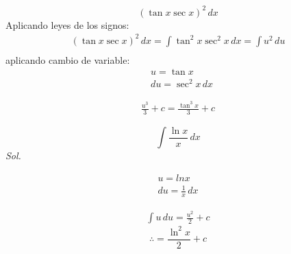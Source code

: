 \begin{problem}
    \begin{equation}
        \left(\tan{x}\sec{x}\right)^2\,dx
    \end{equation}
Aplicando leyes de los signos:
\begin{align*}
    \left(\tan{x}\sec{x}\right)^2\,dx = \int \tan^2{x}\sec^2{x}\,dx = \int u^2\,du\\
\end{align*}
aplicando cambio de variable:
\begin{align*}
    &u = \tan{x}\\
    &du = \sec^2{x}\,dx 
\end{align*}

\begin{align*}
    \frac{u^3}{3} + c = \frac{\tan^3{x}}{3} + c 
\end{align*}

\end{problem}

\begin{problem}
    \begin{equation}
        \int \frac{\ln{x}}{x}\,dx 
    \end{equation}
    \textit{ Sol. }

\begin{align*}
    u = ln{x}\\
    du = \frac{1}{x}\,dx
\end{align*}

\begin{align*}
    \int u\,du = \frac{u^2}{2} + c 
\end{align*}
\begin{equation*}
    \therefore = \frac{\ln^2{x}}{2} + c
\end{equation*}
\end{problem}



